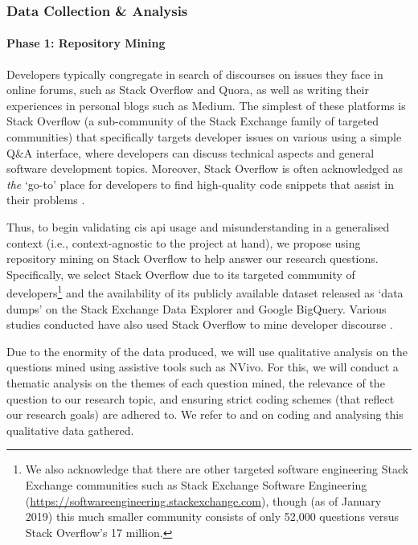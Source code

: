 \subsubsection{Data Collection \& Analysis}

\paragraph{Phase 1: Repository Mining}
Developers typically congregate in search of discourses on issues they face in online forums, such as Stack Overflow and Quora, as well as writing their experiences in personal blogs such as Medium. The simplest of these platforms is Stack Overflow (a sub-community of the Stack Exchange family of targeted communities) that specifically targets developer issues on various using a simple Q\&A interface, where developers can discuss technical aspects and general software development topics. Moreover, Stack Overflow is often acknowledged as \textit{the} `go-to' place for developers to find high-quality code snippets that assist in their problems \citep{Subramanian:2014bg}.

Thus, to begin validating \gls{cis} \gls{api} usage and misunderstanding in a generalised context (i.e., context-agnostic to the project at hand), we propose using repository mining on Stack Overflow to help answer our research questions. Specifically, we select Stack Overflow due to its targeted community of developers\footnote{We also acknowledge that there are other targeted software engineering Stack Exchange communities such as Stack Exchange Software Engineering (\url{https://softwareengineering.stackexchange.com}), though (as of January 2019) this much smaller community consists of only 52,000 questions versus Stack Overflow's 17 million.} and the availability of its publicly available dataset released as `data dumps' on the Stack Exchange Data Explorer and Google BigQuery. Various studies conducted have also used Stack Overflow to mine developer discourse \citep{Choi:2015wo,Sinha:2013tt,Novielli:2015vd,Rosen:2016uk,Pal:2012te,Bajaj:2014wg,LinaresVasquez:2014vj,Wang:2013ue,Barua:2014vo,Reboucas:2016tw,Allamanis:2013vb,Tahir:2018ks}.

Due to the enormity of the data produced, we will use qualitative analysis on the questions mined using assistive tools such as NVivo. For this, we will conduct a thematic analysis on the themes of each question mined, the relevance of the question to our research topic, and ensuring strict coding schemes (that reflect our research goals) are adhered to. We refer to \citet{Singer:2007tu} and \citet{Miles:1994ty} on coding and analysing this qualitative data gathered.

